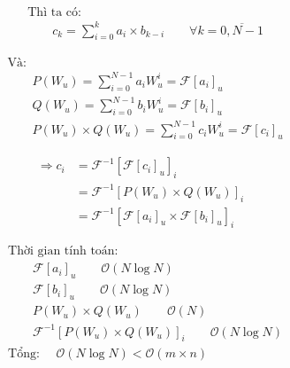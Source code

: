 \documentclass[12pt]{report}
\begin{document}
\begin{align*}
    &\textrm{Thì ta có: } \\
    &\quad\quad c_k = \sum_{i = 0} ^ {k} a_i \times b_{k - i}
    \quad\quad \forall k = \overline{0, N - 1}
\end{align*}

\begin{align*}
    &\textrm{Và: } \\
    &\quad\quad P(W_u) = \sum_{i = 0}^{N - 1} a_i W_u^i 
    = \mathcal{F}[a_i]_u \\
    &\quad\quad Q(W_u) = \sum_{i = 0}^{N - 1} b_i W_u^i 
    = \mathcal{F}[b_i]_u \\
    &\quad\quad P(W_u) \times Q(W_u) = \sum_{i = 0}^{N - 1} c_i W_u^i
    = \mathcal{F}[c_i]_u
\end{align*}

\begin{align*}
    \Rightarrow c_i 
    &= \mathcal{F}^{-1} \left[ \mathcal{F}[c_i]_u \right]_i \\
    &= \mathcal{F}^{-1} \left[ P(W_u) \times Q(W_u) \right]_i \\
    &= \mathcal{F}^{-1} \left[ 
        \mathcal{F}[a_i]_u \times
        \mathcal{F}[b_i]_u \right]_i
\end{align*}

\begin{align*}
    &\textrm{Thời gian tính toán: } \\
    &\quad\quad \mathcal{F}[a_i]_u \quad\quad \mathcal{O}(N \log N) \\
    &\quad\quad \mathcal{F}[b_i]_u \quad\quad \mathcal{O}(N \log N) \\
    &\quad\quad P(W_u) \times Q(W_u) \quad\quad \mathcal{O}(N) \\
    &\quad\quad \mathcal{F}^{-1}[P(W_u) \times Q(W_u)]_i 
    \quad\quad \mathcal{O}(N \log N) \\
    &\textrm{Tổng: } \quad \mathcal{O}(N \log N) < 
                \mathcal{O}\left(m \times n\right)
\end{align*}
\end{document}
